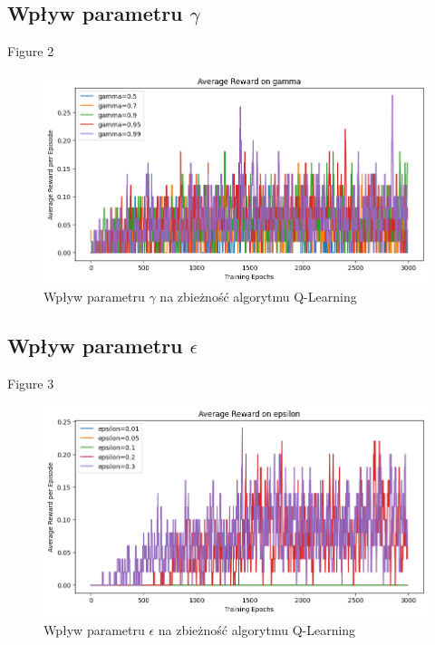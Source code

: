 \documentclass{article}
\begin{document}
\subsection{Wpływ parametru $\gamma$}
Figure 2
\begin{figure}[h!]
    \centering
    \includegraphics[width=\textwidth]{gamma_impact.png}
    \caption{Wpływ parametru $\gamma$ na zbieżność algorytmu Q-Learning}
    \label{fig:gamma_impact}
\end{figure}
 

\subsection{Wpływ parametru $\epsilon$}
Figure 3
\begin{figure}[h!]
    \centering
    \includegraphics[width=\textwidth]{epsilon_impact.png}
    \caption{Wpływ parametru $\epsilon$ na zbieżność algorytmu Q-Learning}
    \label{fig:epsilon_impact}
\end{figure}
 
\end{document}
